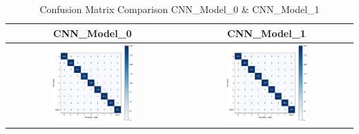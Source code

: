\begin{table}[h!]
    \centering
    \caption{Confusion Matrix Comparison CNN\_Model\_0 \& CNN\_Model\_1}
    \begin{tabular}{|c|c|}
      \hline
      \textbf{CNN\_Model\_0} & \textbf{CNN\_Model\_1} \\
      \hline
      \includegraphics[width=0.5\textwidth]{Images/Perf_Eval/M0_Conf_mat.jpg} & \includegraphics[width=0.5\textwidth]{Images/Perf_Eval/M1_Conf_mat.png} \\
      \hline
    \end{tabular}
\end{table}

